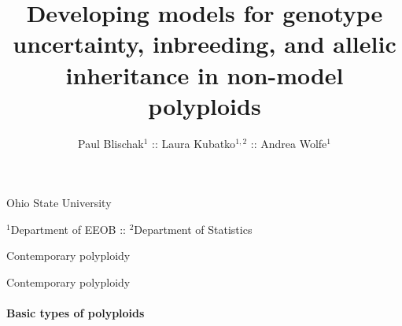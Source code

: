 \documentclass[presentation,sansserif,12pt]{beamer}
\title[Developing pop-gen models for polyploids]{Developing models for genotype uncertainty, inbreeding, and allelic inheritance in non-model polyploids}
\author[Blischak \textit{et al}.]{Paul Blischak$^1$ :: Laura Kubatko$^{1,2}$ :: Andrea Wolfe$^1$}
\date{}
\begin{document}
\beamertemplatenavigationsymbolsempty

\begin{frame}[plain]
	\vspace{-1.2in}
	\titlepage
	
	\vspace{-1.2in}
	\begin{center}
	
		{\footnotesize Ohio State University 	
		\vspace{0.05in}
		
		$^1$Department of EEOB :: $^2$Department of Statistics
		}		
	\end{center}
	\vspace{-0.2in}
		
\end{frame}


\begin{frame}[t]{Contemporary polyploidy}

\end{frame}

\begin{frame}[t]{Contemporary polyploidy}
\framesubtitle{Basic types of polyploids}


	\begin{center}
	\end{center}
	
	
	\begin{center}
	\end{center}

\end{frame}
\end{document}

